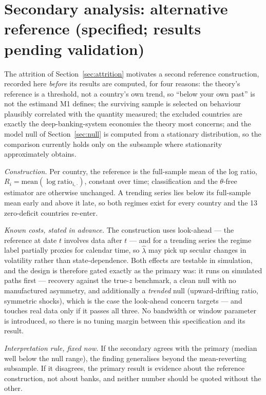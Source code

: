\documentclass[11pt]{article}
\newcommand{\lamhat}{\hat\lambda}
\begin{document}
\section{Secondary analysis: alternative reference (specified;
results pending validation)}
\label{sec:secondary}

The attrition of Section~\ref{sec:attrition} motivates a second
reference construction, recorded here \emph{before} its results are
computed, for four reasons: the theory's reference is a threshold, not a
country's own trend, so ``below your own past'' is not the estimand
M1 defines; the surviving sample is selected on behaviour
plausibly correlated with the quantity measured; the excluded countries
are exactly the deep-banking-system economies the theory most concerns;
and the model null of Section~\ref{sec:null} is computed from a
stationary distribution, so the comparison currently holds only on the
subsample where stationarity approximately obtains.

\emph{Construction.} Per country, the reference is the full-sample mean
of the log ratio, $R_i = \mathrm{mean}(\log\text{ratio}_{i,\cdot})$,
constant over time; classification and the $\theta$-free estimator are
otherwise unchanged. A trending series lies below its full-sample mean
early and above it late, so both regimes exist for every country and the
13 zero-deficit countries re-enter.

\emph{Known costs, stated in advance.} The construction uses look-ahead
--- the reference at date $t$ involves data after $t$ --- and for a
trending series the regime label partially proxies for calendar time, so
$\lamhat$ may pick up secular changes in volatility rather than
state-dependence. Both effects are testable in simulation, and the
design is therefore gated exactly as the primary was: it runs on
simulated paths first --- recovery against the true-$z$ benchmark, a
clean null with no manufactured asymmetry, and additionally a
\emph{trended} null (upward-drifting ratio, symmetric shocks), which is
the case the look-ahead concern targets --- and touches real data only
if it passes all three. No bandwidth or window parameter is introduced,
so there is no tuning margin between this specification and its result.

\emph{Interpretation rule, fixed now.} If the secondary agrees with the
primary (median well below the null range), the finding generalises
beyond the mean-reverting subsample. If it disagrees, the primary result
is evidence about the reference construction, not about banks, and
neither number should be quoted without the other.
\end{document}
